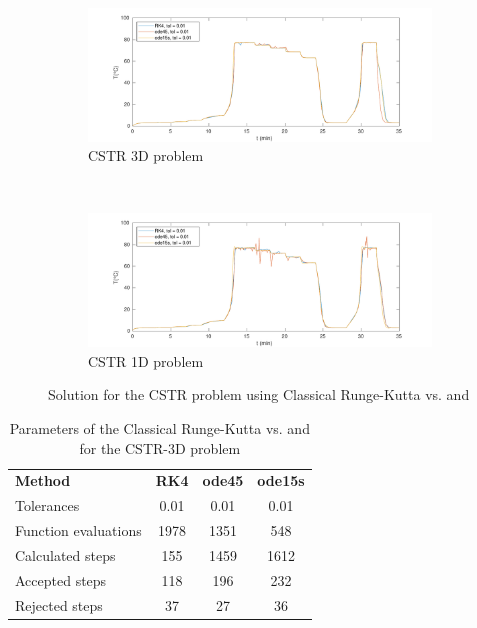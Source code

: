 \begin{figure}[H]
    \centering
    \begin{subfigure}{0.8\linewidth}
        \centering
        \includegraphics[width=1\linewidth]{images/6/6_6_3D.pdf} 
        \caption{CSTR 3D problem}
    \end{subfigure} \\
    \begin{subfigure}{0.8\linewidth}
        \centering
        \includegraphics[width=1\linewidth]{images/6/6_6_1D.pdf}
        \caption{CSTR 1D problem}
    \end{subfigure}
    \caption{Solution for the CSTR problem using Classical Runge-Kutta vs.  and }
    \label{6_6_3D_1D}
\end{figure}

\begin{table}[H]
    \centering
    \begin{tabular}{@{}l|c|c|c@{}}
    \toprule
    \textbf{Method}      & \textbf{RK4} & \textbf{ode45} & \textbf{ode15s} \\
    Tolerances           & 0.01         & 0.01           & 0.01            \\ \midrule
    Function evaluations & 1978         & 1351           & 548             \\
    Calculated steps     & 155          & 1459           & 1612            \\
    Accepted steps       & 118          & 196            & 232             \\
    Rejected steps       & 37           & 27             & 36              \\ \bottomrule
    \end{tabular}
    \caption{Parameters of the Classical Runge-Kutta vs.  and  for the CSTR-3D problem}
    \label{6_6_3D_table}
\end{table}

